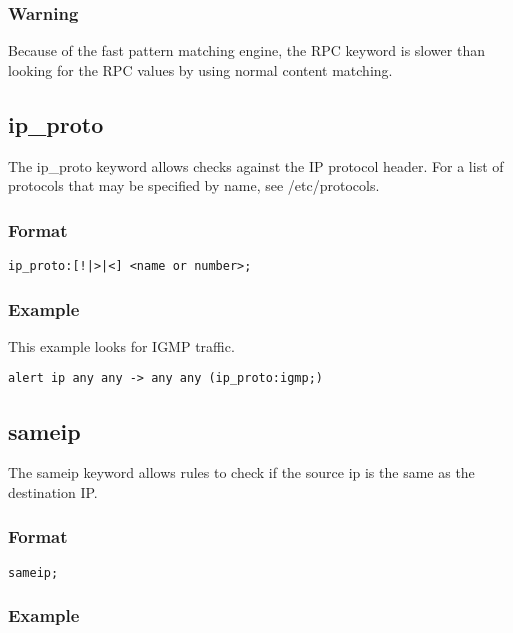 \documentclass[english]{report}
\begin{document}
\subsubsection{Warning}

Because of the fast pattern matching engine, the RPC keyword is slower than looking for the RPC values by using normal content matching.

\subsection{ip\_proto}

The ip\_proto keyword allows checks against the IP protocol header.  For a list
of protocols that may be specified by name, see /etc/protocols. 

\subsubsection{Format}

\begin{verbatim}
ip_proto:[!|>|<] <name or number>;
\end{verbatim}

\subsubsection{Example}
This example looks for IGMP traffic.

\begin{verbatim}
alert ip any any -> any any (ip_proto:igmp;)
\end{verbatim}

\subsection{sameip}

The sameip keyword allows rules to check if the source ip is the same as the destination IP.

\subsubsection{Format}

\begin{verbatim}
sameip;
\end{verbatim}

\subsubsection{Example}
\end{document}
